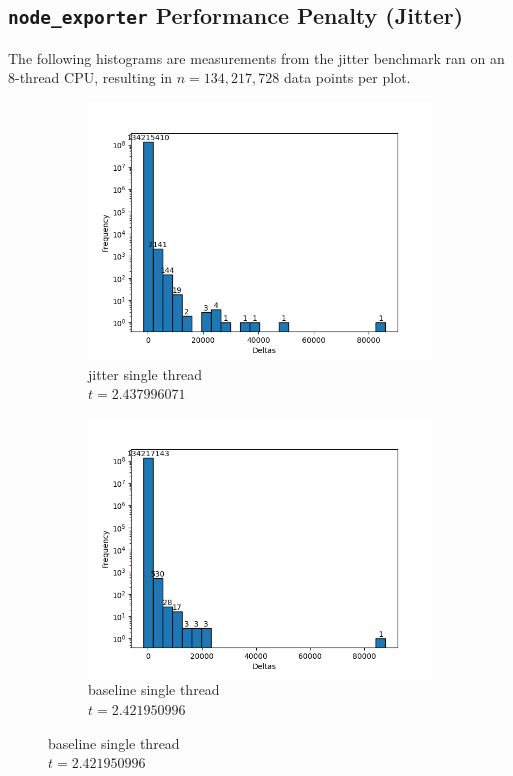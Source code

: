 \subsection{\texttt{node\_exporter} Performance Penalty (Jitter)}
The following histograms are measurements from the jitter benchmark ran on an 8-thread CPU, resulting in $n=134,217,728$ data points per plot.
\begin{figure}[H]
\centering
\begin{subfigure}{.42\textwidth}
  \centering
  \includegraphics[width=\textwidth]{./plots_jitter/jitter/output_size_1_rank_0_25.png}
  \caption{jitter single thread\\$t=2.437996071$}
\end{subfigure}%
\begin{subfigure}{.42\textwidth}
  \centering
  \includegraphics[width=\textwidth]{./plots_jitter/jitter_baseline/output_size_1_rank_0_25.png}
  \caption{baseline single thread\\$t=2.421950996$}
\end{subfigure}


\end{figure}
